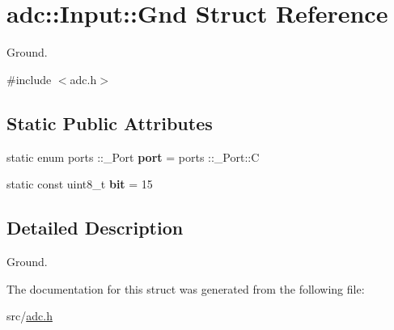 \hypertarget{structadc_1_1Input_1_1Gnd}{}\section{adc\+:\+:Input\+:\+:Gnd Struct Reference}
\label{structadc_1_1Input_1_1Gnd}


Ground.  




{\ttfamily \#include $<$adc.\+h$>$}

\subsection*{Static Public Attributes}
\begin{DoxyCompactItemize}
\item 
\hypertarget{structadc_1_1Input_1_1Gnd_a1115375eb1ceecc4104601bff24bd253}{}\label{structadc_1_1Input_1_1Gnd_a1115375eb1ceecc4104601bff24bd253} 
static enum ports \+::\+\_\+\+Port {\bfseries port} = ports \+::\+\_\+\+Port\+::C
\item 
\hypertarget{structadc_1_1Input_1_1Gnd_ac4396959d7953db075098bb106a39deb}{}\label{structadc_1_1Input_1_1Gnd_ac4396959d7953db075098bb106a39deb} 
static const uint8\+\_\+t {\bfseries bit} = 15
\end{DoxyCompactItemize}


\subsection{Detailed Description}
Ground. 

The documentation for this struct was generated from the following file\+:\begin{DoxyCompactItemize}
\item 
src/\hyperlink{adc_8h}{adc.\+h}\end{DoxyCompactItemize}
